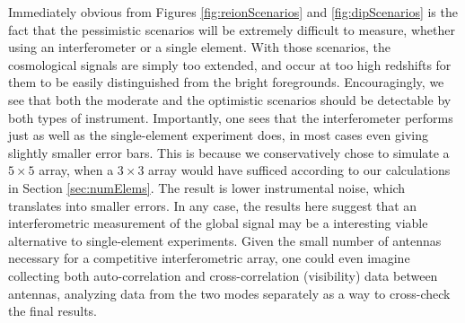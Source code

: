 \documentclass[twocolumn,apj,numberedappendix]{emulateapj}
\begin{document}
Immediately obvious from Figures \ref{fig:reionScenarios} and  \ref{fig:dipScenarios} is the fact that the pessimistic scenarios will be extremely difficult to measure, whether using an interferometer or a single element. With those scenarios, the cosmological signals are simply too extended, and occur at too high redshifts for them to be easily distinguished from the bright foregrounds. Encouragingly, we see that both the moderate and the optimistic scenarios should be detectable by both types of instrument. Importantly, one sees that the interferometer performs just as well as the single-element experiment does, in most cases even giving slightly smaller error bars. This is because we conservatively chose to simulate a $5\times 5$ array, when a $3 \times 3$ array would have sufficed according to our calculations in Section \ref{sec:numElems}. The result is lower instrumental noise, which translates into smaller errors. In any case, the results here suggest that an interferometric measurement of the global signal may be a interesting viable alternative to single-element experiments. Given the small number of antennas necessary for a competitive interferometric array, one could even imagine collecting both auto-correlation and cross-correlation (visibility) data between antennas, analyzing data from the two modes separately as a way to cross-check the final results.
\end{document}
